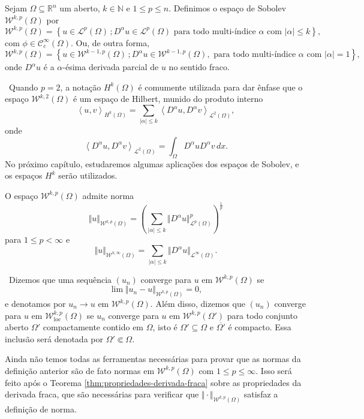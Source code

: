 \documentclass[a4paper, 11pt]{book}
\theoremstyle{definition}
\newcommand{\obs}{\noindent{\textbf{\textcolor{black}{\sffamily Observação:}}}~}
\newcommand{\bN}{\mathbb{N}}
\newcommand{\bR}{\mathbb{R}}
\newcommand{\cC}{\mathcal{C}}
\newcommand{\cL}{\mathcal{L}}
\newcommand{\cW}{\mathcal{W}}
\newcommand{\esssup}{\mathrm{ess\,sup}\,}
\newcommand{\loc}{\mathrm{loc}}
\begin{document}
\begin{dbox}
    Sejam $\Omega \subseteq \bR ^n$ um aberto, $k \in \bN$ e $1 \leqslant p \leqslant n$. Definimos o espaço de Sobolev $\cW^{k,p}(\Omega)$ por
    \[
        \cW^{k,p}(\Omega) = \left\{ u \in \cL^p(\Omega) \,; D^\alpha u \in \cL^p(\Omega) \text{ para todo multi-índice } \alpha \text{ com } |\alpha| \leqslant k\right\},
    \]
    com $\phi \in \cC^\infty_c(\Omega)$. 
    Ou, de outra forma,
    \[
        \cW^{k,p}(\Omega) = \left\{ u \in \cW^{k-1,p}(\Omega) \,; D^\alpha u \in \cW^{k-1,p}(\Omega) , \text{ para todo multi-índice } \alpha \text{ com } |\alpha| = 1\right\},
    \]
    onde $D^\alpha u$ é a $\alpha$-ésima derivada parcial de $u$ no sentido fraco.
\end{dbox}

\obs Quando $p = 2$, a notação $H^{k}(\Omega)$ é comumente utilizada para dar ênfase que o espaço $\cW^{k,2}(\Omega)$ é um espaço de Hilbert, munido do produto interno
\[
    \left\langle u, v\right\rangle _{H^k(\Omega)} = \sum_{|\alpha| \leqslant k} \left\langle D^\alpha u, D^\alpha v\right\rangle _{\cL^2(\Omega)},
\]
onde
\[
    \left\langle D^\alpha u, D^\alpha v\right\rangle _{\cL^2(\Omega)} = \int_\Omega D^\alpha u D^\alpha v \,dx.
\]
No próximo capítulo, estudaremos algumas aplicações dos espaços de Sobolev, e os espaços $H^k$ serão utilizados.

\begin{dbox}
    O espaço $\cW^{k,p}(\Omega)$ admite norma
    \[
        \Vert u \Vert_{\cW^{k,p}(\Omega)} = \left( \sum_{|\alpha| \leqslant k} \Vert D^\alpha u \Vert_{\cL^p(\Omega)}^p \right)^{\frac{1}{p}}
    \]
    para $1 \leqslant p < \infty$ e 
    \[
        \Vert u \Vert_{\cW^{k,\infty}(\Omega)} 
        = \sum_{|\alpha| \leqslant k} \Vert D^{\alpha}u \Vert_{\cL^\infty(\Omega)}.
    \]
\end{dbox}

\obs Dizemos que uma sequência $(u_n)$ converge para $u$ em $\cW^{k,p}(\Omega)$ se
\[
    \lim \Vert u_n - u \Vert_{\cW^{k,p}(\Omega)} = 0,
\]
e denotamos por $u_n \to u \text{ em } \cW^{k,p}(\Omega)$.
Além disso, dizemos que $(u_n)$ converge para $u$ em $\cW^{k,p}_\loc(\Omega)$ se $u_n$ converge para $u$ em $\cW^{k,p}(\Omega')$ para todo conjunto aberto $\Omega'$ compactamente contido em $\Omega$, isto é $\Omega' \subseteq \Omega$ e $\overline{\Omega'}$ é compacto. Essa inclusão será denotada por $\Omega' \Subset \Omega$.

Ainda não temos todas as ferramentas necessárias para provar que as normas da definição anterior são de fato normas em $\cW^{k,p}(\Omega)$ com $1 \leqslant p \leqslant \infty$. Isso será feito após o Teorema \ref{thm:propriedades-derivada-fraca} sobre as propriedades da derivada fraca, que são necessárias para verificar que $\Vert \cdot \Vert_{\cW^{k,p}(\Omega)}$ satisfaz a definição de norma.
\end{document}
